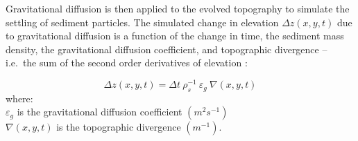\documentclass[final,3p,times,twocolumn]{elsarticle}
\begin{document}
\noindent
Gravitational diffusion is then applied to the evolved topography
to simulate the settling of sediment particles. 
The simulated change in elevation $\Delta z(x,y,t) $ due to gravitational diffusion 
is a function of the change in time, the sediment mass density, 
the gravitational diffusion coefficient, and topographic divergence 
-- i.e.~the sum of the second order derivatives of elevation
\cite{thaxton2004}:

\begin{equation}
\label{eq:grav_diffusion} 
{\Delta z(x,y,t) = \Delta t ~ \rho_s^{-1} ~ \varepsilon_g ~ \nabla(x,y,t)}
\end{equation}
%
{\small
\noindent
where: \\
\noindent
\hspace*{0.5em} $\varepsilon_g$ is the gravitational diffusion coefficient $(m^{2} s^{-1})$\\ %
\hspace*{0.5em} $\nabla(x,y,t)$ is the topographic divergence $(m^{-1})$.\\
}

\end{document}
